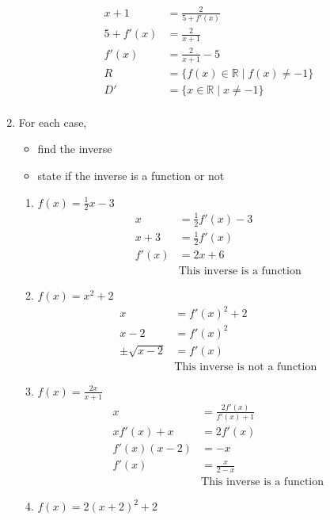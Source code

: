\documentclass[paper=a4, fontsize=11pt]{scrartcl}
\begin{document}
\begin{enumerate}[resume]
\begin{align*}
            x+1&=\frac{2}{5+f'(x)}\\
            5+f'(x)&=\frac{2}{x+1}\\
            f'(x)&=\frac{2}{x+1}-5\\
            R&=\{f(x)\in\mathbb{R}\mid f(x)\neq -1\}\\
            D'&=\{x\in\mathbb{R}\mid x\neq -1\}\\
        \end{align*}
        \item For each case,
        \begin{itemize}
            \item find the inverse
            \item state if the inverse is a function or not
        \end{itemize}
        \begin{enumerate}
            \item $f(x)=\frac{1}{2}x-3$
            \begin{align*}
                x&=\frac{1}{2}f'(x)-3\\
                x+3&=\frac{1}{2}f'(x)\\
                f'(x)&=2x+6\\
                &\text{This inverse is a function}
            \end{align*}
            \item $f(x)=x^2+2$
            \begin{align*}
                x&=f'(x)^2+2\\
                x-2&=f'(x)^2\\
                \pm\sqrt{x-2}&=f'(x)\\
                &\text{This inverse is not a function}
            \end{align*}
            \item $f(x)=\frac{2x}{x+1}$
            \begin{align*}
                x&=\frac{2f'(x)}{f'(x)+1}\\
                xf'(x)+x&=2f'(x)\\
                f'(x)(x-2)&=-x\\
                f'(x)&=\frac{x}{2-x}\\
                &\text{This inverse is a function}
            \end{align*}
            \item $f(x)=2(x+2)^2+2$
            \begin{align*}

\end{align*}
\end{enumerate}
\end{enumerate}
\end{document}
